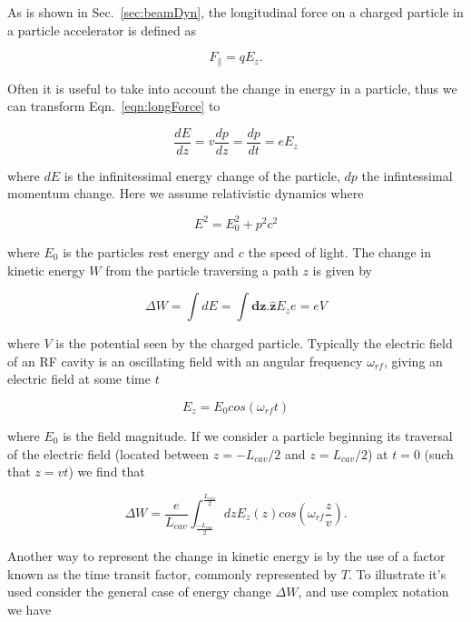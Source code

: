 As is shown in Sec.~\ref{sec:beamDyn}, the longitudinal force on a charged particle in a particle accelerator is defined as 

\begin{equation}
F_{\parallel} = qE_{z}.
\label{eqn:longForce}
\end{equation}

Often it is useful to take into account the change in energy in a particle, thus we can transform Eqn.~\ref{eqn:longForce} to

\begin{equation}
\frac{dE}{dz} = v\frac{dp}{dz} = \frac{dp}{dt} = eE_{z}
\end{equation}

where $dE$ is the infinitessimal energy change of the particle, $dp$ the infintessimal momentum change. Here we assume relativistic dynamics where 

\begin{equation}
E^{2} = E_{0}^{2} + p^{2}c^{2}
\end{equation}

where $E_{0}$ is the particles rest energy and $c$ the speed of light. The change in kinetic energy $W$ from the particle traversing a path $z$ is given by

\begin{equation}
\Delta W = \int dE = \int \mathbf{dz}.\mathbf{\hat{z}} E_{z} e = eV
\end{equation}

where $V$ is the potential seen by the charged particle. Typically the electric field of an RF cavity is an oscillating field with an angular frequency $\omega_{rf}$, giving an electric field at some time $t$

\begin{equation}
E_{z} = E_{0} cos \left( \omega_{rf} t \right)
\end{equation}

where $E_{0}$ is the field magnitude. If we consider a particle beginning its traversal of the electric field (located between $z=-L_{cav}/2$ and $z=L_{cav}/2$) at $t=0$ (such that $z=vt$) we find that

\begin{equation}
\Delta W = \frac{e}{L_{cav}} \int^{\frac{L_{cav}}{2}}_{\frac{-L_{cav}}{2}} dz E_{z}\left( z \right) cos \left( \omega_{rf} \frac{z}{v} \right).
\end{equation}

Another way to represent the change in kinetic energy is by the use of a factor known as the time transit factor, commonly represented by $T$. To illustrate it's used consider the general case of energy change $\Delta W$, and use complex notation we have

